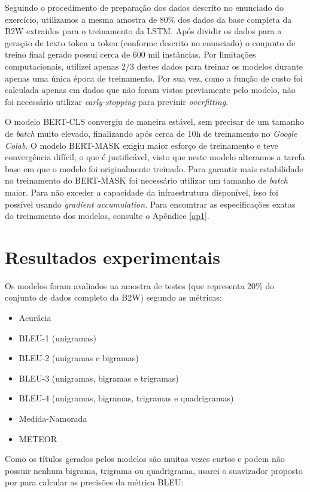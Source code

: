 \documentclass{article}
\begin{document}
Seguindo o procedimento de preparação dos dados descrito no enunciado do exercício, utilizamos a mesma amostra de 80\% dos dados da base completa da B2W extraidos para o treinamento da LSTM. Após dividir os dados para a geração de texto token a token (conforme descrito no enunciado) o conjunto de treino final gerado possui cerca de 600 mil instâncias. Por limitações computacionais, utilizei apenas 2/3 destes dados para treinar os modelos durante apenas uma única época de treinamento. Por sua vez, como a função de custo foi calculada apenas em dados que não foram vistos previamente pelo modelo, não foi necessário utilizar \textit{early-stopping} para previnir \textit{overfitting}.

O modelo BERT-CLS convergiu de maneira estável, sem precisar de um tamanho de \textit{batch} muito elevado, finalizando após cerca de 10h de treinamento no \textit{Google Colab}. O modelo BERT-MASK exigiu maior esforço de treinamento e teve convergência difícil, o que é justificável, visto que neste modelo alteramos a tarefa base em que o modelo foi originalmente treinado. Para garantir mais estabilidade no treinamento do BERT-MASK foi necessário utilizar um tamanho de \textit{batch} maior. Para não exceder a capacidade da infraestrutura disponível, isso foi possível usando \textit{gradient accumulation}. Para encomtrar as especificações exatas do treinamento dos modelos, consulte o Apêndice \ref{ap1}.


\section{Resultados experimentais}

Os modelos foram avaliados na amostra de testes (que representa 20\% do conjunto de dados completo da B2W) segundo as métricas:

\begin{itemize}
	\item Acurácia
	\item BLEU-1 (unigramas)
	\item BLEU-2 (unigramas e bigramas)
	\item BLEU-3 (unigramas, bigramas e trigramas)
	\item BLEU-4 (unigramas, bigramas, trigramas e quadrigramas)
	\item Medida-Namorada
	\item METEOR
\end{itemize}

Como os títulos gerados pelos modelos são muitas vezes curtos e podem não possuir nenhum bigrama, trigrama ou quadrigrama, usarei o suavizador proposto por \textcite{lin2004automatic} para calcular as precisões da métrica BLEU:
\end{document}
